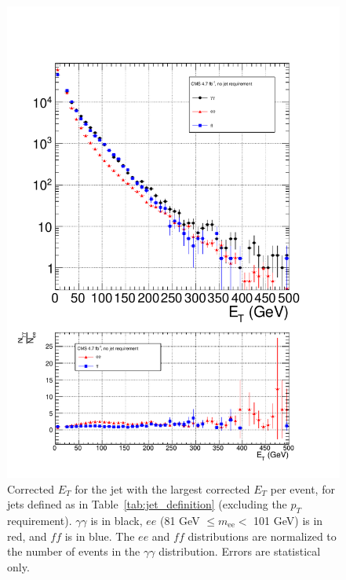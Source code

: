 \documentclass[dissertation_bw.tex]{subfiles}
\begin{document}
\begin{figure}
	\centering
	\includegraphics[scale=0.5]{hadronic_activity_j1ET}
	\caption{Corrected $E_{T}$ for the jet with the largest corrected $E_{T}$ per event, for jets defined as in Table~\ref{tab:jet_definition} (excluding the $p_{T}$ requirement).  $\gamma\gamma$ is in black, $ee$ (81 GeV $\leq m_{\mathrm{ee}} <$ 101 GeV) is in red, and $\mathit{ff}$ is in blue.  The $ee$ and $\mathit{ff}$ distributions are normalized to the number of events in the $\gamma\gamma$ distribution.  Errors are statistical only.}
	\label{fig:hadronic_activity_j1ET}
\end{figure}
\end{document}
